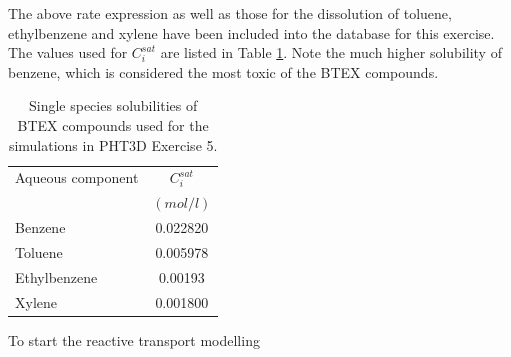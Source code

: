 The above rate expression as well as those for the dissolution
of toluene, ethylbenzene and xylene have been included into the database
for this exercise. The values used for $C_{i}^{sat}$ are 
listed in Table \ref{solub_single_species}. Note the much higher
solubility of benzene, which is considered the most toxic of the
BTEX compounds.

\begin{table}[b]
\caption{Single species solubilities of BTEX compounds used for the simulations
in PHT3D Exercise 5.}
\begin{center}
\begin{tabular}{l c }
\toprule
Aqueous component    & $C_{i}^{sat}$     \\
                     & $(mol/l)$        \\ 
\midrule
Benzene              &  0.022820  \\
Toluene              &  0.005978  \\
Ethylbenzene         &  0.00193   \\
Xylene               &  0.001800  \\
\bottomrule

\end{tabular}
\label{solub_single_species}
\end{center}
\end{table}

To start the reactive transport modelling

